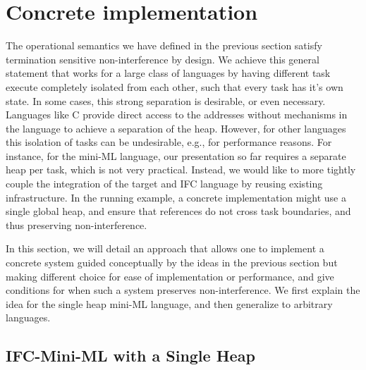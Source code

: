 \section{Concrete implementation}
\label{sec:concrete}

\newcommand{\con}[1]{\ensuremath{{\color{red} #1}}}
\newcommand{\abs}[1]{\ensuremath{{\color{blue} #1}}}

The operational semantics we have defined in the previous section
satisfy termination sensitive non-interference by design.
We achieve this general statement that works for a large class of
languages by having different task execute completely isolated from
each other, such that every task has it's own state.
In some cases, this strong separation is desirable, or even necessary.
Languages like C provide direct access to the addresses without
mechanisms in the language to achieve a separation of the heap.
However, for other languages this isolation of tasks can be
undesirable, e.g., for performance reasons.
For instance, for the mini-ML language, our presentation so far
requires a separate heap per task, which is not very practical.
Instead, we would like to
more tightly couple the integration of the target and IFC
language by reusing existing infrastructure.  In the running example,
a concrete implementation might use a single global heap, and ensure
that references do not cross task boundaries, and thus preserving
non-interference.

In this section, we will detail an approach that allows one to implement
a concrete system guided conceptually by the ideas in the previous
section but making different choice for ease of implementation or
performance, and give conditions for when such a system preserves
non-interference.
We first explain the idea for the single heap mini-ML language, and then
generalize to arbitrary languages.

\subsection{IFC-Mini-ML with a Single Heap}

